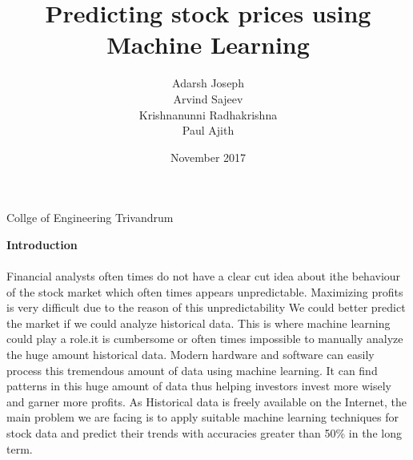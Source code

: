 \documentclass[]{article}
\begin{document}
\title{Predicting stock prices using Machine Learning}
\author{Adarsh Joseph \\Arvind Sajeev \\Krishnanunni Radhakrishna\\Paul Ajith}
\date{November 2017}
\begin{titlepage}
\maketitle
\begin{center}

{\large Collge of Engineering Trivandrum}

\end{center}

\end{titlepage}
\textbf{{\large Introduction}}\\ \\
Financial analysts often times do not have a clear cut idea about ithe behaviour of the stock market which often times appears unpredictable. Maximizing profits is very difficult due to the reason of this unpredictability We could better predict the market if we could analyze historical data. This is where machine learning could play a role.it is cumbersome or often times impossible to manually analyze the huge amount historical data. Modern hardware
and software can easily process this tremendous amount of data using machine learning. It can find patterns in this huge amount of data thus helping investors invest more wisely and garner more profits. As Historical data is freely available on the Internet, the main problem we are facing is to apply suitable machine learning techniques for stock data and predict their trends with accuracies greater than 50\% in the long term.
\end{document}
